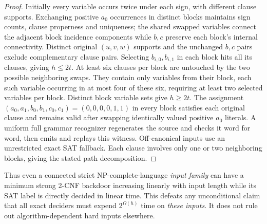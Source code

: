 \documentclass[11pt]{article}
\begin{document}
\begin{proof}
Initially every variable occurs twice under each sign, with different clause supports. Exchanging positive $a_0$ occurrences in distinct blocks maintains sign counts, clause properness and uniqueness; the shared swapped variables connect the adjacent block incidence components while $b,c$ preserve each block's internal connectivity. Distinct original $(u,v,w)$ supports and the unchanged $b,c$ pairs exclude complementary clause pairs. Selecting $b_{i,0},b_{i,1}$ in each block hits all its clauses, giving $h\le2t$. At least six clauses per block are untouched by the two possible neighboring swaps. They contain only variables from their block, each such variable occurring in at most four of these six, requiring at least two selected variables per block. Distinct block variable sets give $h\ge2t$. The assignment $(a_0,a_1,b_0,b_1,c_0,c_1)=(0,0,0,0,1,1)$ in every block satisfies each original clause and remains valid after swapping identically valued positive $a_0$ literals. A uniform full grammar recognizer regenerates the source and checks it word for word, then emits and replays this witness. Off-canonical inputs use an unrestricted exact SAT fallback. Each clause involves only one or two neighboring blocks, giving the stated path decomposition.
\end{proof}
Thus even a connected strict NP-complete-language \emph{input family} can have a minimum strong 2-CNF backdoor increasing linearly with input length while its SAT label is directly decided in linear time. This defeats any unconditional claim that all exact deciders must expend $2^{\Omega(h)}$ time on \emph{these inputs}. It does not rule out algorithm-dependent hard inputs elsewhere.
\end{document}
